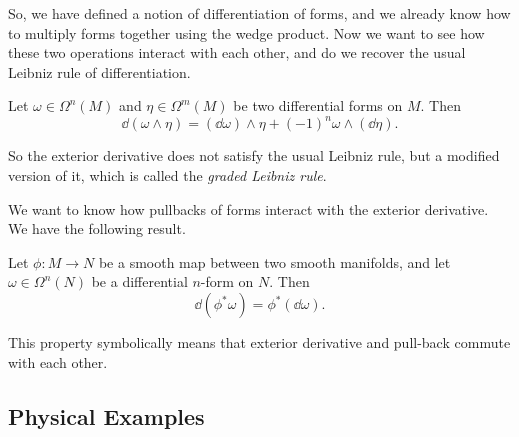 So, we have defined a notion of differentiation of forms, and we already know how to multiply forms together using the wedge product. Now we want to see how these two operations interact with each other, and do we recover the usual Leibniz rule of differentiation.
\begin{theorem}
    Let \(\omega \in \Omega^n(M)\) and \(\eta \in \Omega^m(M)\) be two differential forms on \(M\). Then
    \begin{equation*}
        \dd(\omega \wedge \eta) = (\dd \omega) \wedge \eta + (-1)^n \omega \wedge (\dd \eta).
    \end{equation*}
\end{theorem}
So the exterior derivative does not satisfy the usual Leibniz rule, but a modified version of it, which is called the \emph{graded Leibniz rule}.

We want to know how pullbacks of forms interact with the exterior derivative. We have the following result.
\begin{theorem}
    Let \(\phi: M \to N\) be a smooth map between two smooth manifolds, and let \(\omega \in \Omega^n(N)\) be a differential \(n\)-form on \(N\). Then
    \begin{equation*}
        \dd(\phi^* \omega) = \phi^*(\dd \omega).
    \end{equation*}
\end{theorem}
This property symbolically means that exterior derivative and pull-back commute with each other.

\subsection{Physical Examples}

